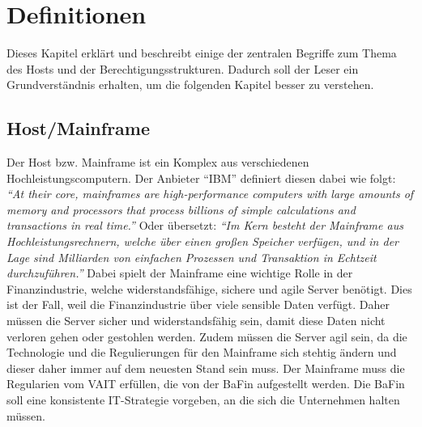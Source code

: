 \chapter{Definitionen}
\label{ch:chapter02}
Dieses Kapitel erklärt und beschreibt einige der zentralen Begriffe zum Thema des Hosts und der Berechtigungsstrukturen.
Dadurch soll der Leser ein Grundverständnis erhalten, um die folgenden Kapitel besser zu verstehen.

%
%

\section{Host/Mainframe}
\label{sec:Host}
Der Host bzw. Mainframe ist ein Komplex aus verschiedenen Hochleistungscomputern.
Der Anbieter "`IBM"' definiert diesen dabei wie folgt: 
\newline
\newline
\textit{"`At their core, mainframes are high-performance computers with large amounts of memory and processors that process billions of simple calculations and transactions in real time."'} \cite{Mainframe}
\newline
\newline
Oder übersetzt:
\newline
\newline
\textit{"`Im Kern besteht der Mainframe aus Hochleistungsrechnern, welche über einen großen Speicher verfügen, und in der Lage sind Milliarden von einfachen Prozessen und Transaktion in Echtzeit durchzuführen."'} \cite{Mainframe}
\newline
\newline
Dabei spielt der Mainframe eine wichtige Rolle in der Finanzindustrie, welche widerstandsfähige, sichere und agile Server benötigt.
Dies ist der Fall, weil die Finanzindustrie über viele sensible Daten verfügt.
Daher müssen die Server sicher und widerstandsfähig sein, damit diese Daten nicht verloren gehen oder gestohlen werden.
Zudem müssen die Server agil sein, da die Technologie und die Regulierungen für den Mainframe sich stehtig ändern und dieser daher immer auf dem neuesten Stand sein muss.
Der Mainframe muss die Regularien vom \ac{VAIT} erfüllen, die von der \ac{BaFin} aufgestellt werden.
Die \ac{BaFin} soll eine konsistente IT-Strategie vorgeben, an die sich die Unternehmen halten müssen. \cite{Vait}

